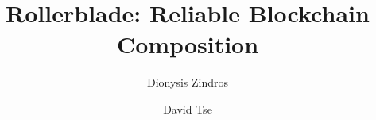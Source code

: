 \title{
  Rollerblade:
  Reliable Blockchain Composition
}
\ifanonymous{\iflncs
\author{}\institute{}
\fi}
\else
\author{
  Dionysis Zindros\and
  David Tse
}
\iflncs
{}
\else
{}
\fi
\fi

